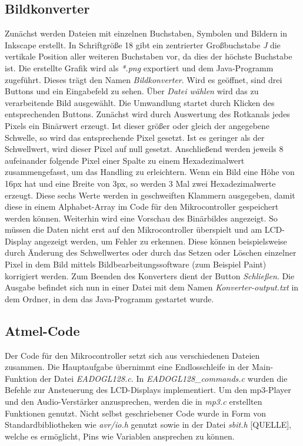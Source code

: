 \documentclass[journal, a4paper]{IEEEtran}
\begin{document}
	\subsection{Bildkonverter}
		\label{sc:Software:Subsc:Bildkonverter}
		Zunächst werden Dateien mit einzelnen Buchstaben, Symbolen und Bildern in Inkscape erstellt. In Schriftgröße 18 gibt ein zentrierter Großbuchstabe \textit{J} die vertikale Position aller weiteren Buchstaben vor, da dies der höchste Buchstabe ist. Die erstellte Grafik wird als \textit{*.png} exportiert und dem Java-Programm zugeführt. Dieses trägt den Namen \textit{Bildkonverter}. Wird es geöffnet, sind drei Buttons und ein Eingabefeld zu sehen. Über \textit{Datei wählen} wird das zu verarbeitende Bild ausgewählt. Die Umwandlung startet durch Klicken des entsprechenden Buttons. Zunächst wird durch Auswertung des Rotkanals jedes Pixels ein Binärwert erzeugt. Ist dieser größer oder gleich der angegebene Schwelle, so wird das entsprechende Pixel gesetzt. Ist es geringer als der Schwellwert, wird dieser Pixel auf null gesetzt. Anschließend werden jeweils 8 aufeinander folgende Pixel einer Spalte zu einem Hexadezimalwert zusammengefasst, um das Handling zu erleichtern. Wenn ein Bild eine Höhe von 16px hat und eine Breite von 3px, so werden 3 Mal zwei Hexadezimalwerte erzeugt. Diese sechs Werte werden in geschweiften Klammern ausgegeben, damit diese in einem Alphabet-Array im Code für den Mikrocontroller gespeichert werden können. Weiterhin wird eine Vorschau des Binärbildes angezeigt. So müssen die Daten nicht erst auf den Mikrocontroller überspielt und am LCD-Display angezeigt werden, um Fehler zu erkennen. Diese können beispielsweise durch Änderung des Schwellwertes oder durch das Setzen oder Löschen einzelner Pixel in dem Bild mittels Bildbearbeitungssoftware (zum Beispiel Paint) korrigiert werden. Zum Beenden des Konverters dient der Button \textit{Schließen}. Die Ausgabe befindet sich nun in einer Datei mit dem Namen \textit{Konverter-output.txt} in dem Ordner, in dem das Java-Programm gestartet wurde.\par
	\subsection{Atmel-Code}
	\label{sc:Software:subsc:Atmel-Code}
	Der Code für den Mikrocontroller setzt sich aus verschiedenen Dateien zusammen. Die Hauptaufgabe übernimmt eine Endlosschleife in der Main-Funktion der Datei \emph{EADOGL128.c}. In \emph{EADOGL128\_commands.c} wurden die Befehle zur Ansteuerung des LCD-Displays implementiert. Um den mp3-Player und den Audio-Verstärker anzusprechen, werden die in \emph{mp3.c} erstellten Funktionen genutzt. Nicht selbst geschriebener Code wurde in Form von Standardbibliotheken wie \emph{avr/io.h} genutzt sowie in der Datei \emph{sbit.h} [QUELLE], welche es ermöglicht, Pins wie Variablen ansprechen zu können.
	
\end{document}
